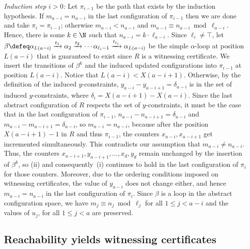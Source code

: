 \emph{Induction step  $i>0$:} Let 
$\pi_{i-1}$ be the path that exists by the induction hypothesis. If
$m_{a-i}=n_{a-i}$ in the last configuration of $\pi_{i-1}$ then we are
done and take $\pi_i=\pi_{i-1}$; otherwise $m_{a-i} < n_{a-i}$ and
$m_{a-i} \equiv n_{a-i} \bmod
\ell_{a-i}$. Hence, there is some $k\in \N$ such that $n_{a-i}= k
\cdot \ell_{a-i}$. Since $\ell_i\neq\top$, let
$\beta\defeq\alpha_{L(a-i)} \xrightarrow{t_1} \alpha_2
\xrightarrow{t_2} \cdots
\alpha_{\ell_i-1}\xrightarrow{t_{\ell_i}}\alpha_{L(a-i)}$ be the
simple $\alpha$-loop at position $L(a-i)$ that is guaranteed to exist
since $R$ is a witnessing certificate. We insert the transitions of
$\beta^k$ and the induced updated configurations into $\pi_{i-1}$ at
position $L(a-i)$. Notice that $L(a-i) < X(a-i+1)$. Otherwise, by the
definition of the induced $y$-constraints,
$y_{a-i}-y_{a-i+1}=\delta_{a-i}$ is in the set of induced
$y$-constraints, where $\delta_i= X(a-i+1)-X(a-i)$. Since the last
abstract configuration of $R$ respects the set of $y$-constraints, it
must be the case that in the last configuration of $\pi_{i-1}$,
$n_{a-i}-n_{a-i+1}= \delta_{a-i}$ and
$m_{a-i}-m_{a-i+1}=\delta_{a-i}$, so $m_{a-i}=n_{a-i}$, because after
the position $X(a-i+1)-1$ in $R$ and thus $\pi_{i-1}$, the counters
$x_{a-i},x_{a-i+1}$ get incremented simultaneously. This contradicts
our assumption that $m_{a-i}\neq n_{a-i}$. Thus, the counters
$x_{a-i+1},y_{a-i+1},\ldots,x_d,y_d$ remain unchanged by the insertion
of $\beta^k$, so (ii) and consequently~(i) continues to hold in the
last configuration of $\pi_i$ for those counters. Moreover, due to the
ordering conditions imposed on witnessing certificates, the value of
$y_{a-i}$ does not change either, and hence $m_{a-i}=n_{a-i}$ in the
last configuration of $\pi_i$. Since $\beta$ is a loop in the abstract
configuration space, we have $m_j \equiv n_j \bmod \ell_j$ for all
$1\le j< a-i$ and the values of $u_j$, for all $1\le j<a$ are
preserved.


\subsection{Reachability yields witnessing certificates}\label{ssec:non-empty-to-certificate}


